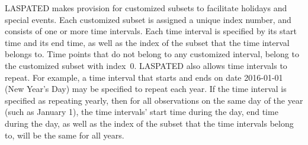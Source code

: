 \documentclass[article]{jss}
\begin{document}
LASPATED makes provision for customized subsets to facilitate holidays and special events.
Each customized subset is assigned a unique index number, and consists of one or more time intervals.
Each time interval is specified by its start time and its end time, as well as the index of the subset that the time interval belongs to.
Time points that do not belong to any customized interval, belong to the customized subset with index~$0$.
LASPATED also allows time intervals to repeat.
For example, a time interval that starts and ends on date 2016-01-01 (New Year's Day) may be specified to repeat each year.
If the time interval is specified as repeating yearly, then for all observations on the same day of the year (such as January 1), the time intervals' start time during the day, end time during the day, as well as the index of the subset that the time intervals belong to, will be the same for all years.
\end{document}
